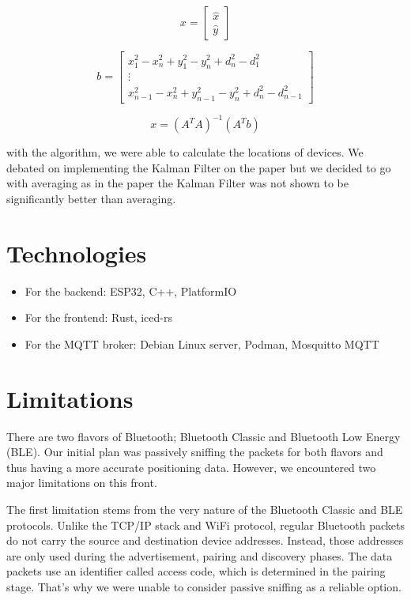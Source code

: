 \documentclass[11pt]{article}
\begin{document}
\[
x = 
\begin{bmatrix}
\hat{x} \\
\hat{y}
\end{bmatrix}
\]

\[
b = 
\begin{bmatrix}
x_1^2 - x_n^2 + y_1^2 - y_n^2 + d_n^2 - d_1^2 \\
\vdots \\
x_{n-1}^2 - x_n^2 + y_{n-1}^2 - y_n^2 + d_n^2 - d_{n-1}^2
\end{bmatrix} \]

\[
x = (A^T A)^{-1} (A^T b)
\]

with the algorithm, we were able to calculate the locations of devices. We debated on implementing the Kalman Filter on the paper but we decided to go with averaging as in the paper the Kalman Filter was not shown to be significantly better than averaging.

\section{Technologies}

\begin{itemize}
    \item For the backend: ESP32, C++, PlatformIO
    \item For the frontend: Rust, iced-rs
    \item For the MQTT broker: Debian Linux server, Podman, Mosquitto MQTT
\end{itemize}

\section{Limitations}

There are two flavors of Bluetooth\cite{esp32-bt-arch}; Bluetooth Classic and Bluetooth Low Energy (BLE). Our initial plan was passively sniffing the packets for both flavors and thus having a more accurate positioning data. However, we encountered two major limitations on this front. 

The first limitation stems from the very nature of the Bluetooth Classic and BLE protocols. Unlike the TCP/IP stack and WiFi protocol, regular Bluetooth packets do not carry the source and destination device addresses. Instead, those addresses are only used during the advertisement, pairing and discovery phases. The data packets use an identifier called access code, which is determined in the pairing stage. That's why we were unable to consider passive sniffing as a reliable option.
\end{document}
